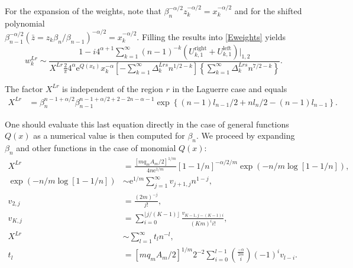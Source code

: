 \documentclass[11pt]{article}
\newcommand{\R}{{\operatorname{right}}}
\renewcommand{\L}{{\operatorname{left}}}
\newcommand{\ql}{L}
\newcommand{\rg}{r}
\newcommand{\pg}{p}
\newcommand{\pd}{d}
\newcommand{\ps}{s}
\numberwithin{equation}{section}
\newcommand{\ee}{\mathrm{e}}
\begin{document}
For the expansion of the weights, note that $\beta_n^{-\alpha/2} z_k^{-\alpha/2} = x_k^{-\alpha/2}$ and for the shifted polynomial \\$\beta_{n-1}^{-\alpha/2} \left(\bar{z} = z_k \beta_{n}/\beta_{n-1}\right)^{-\alpha/2} = x_k^{-\alpha/2}$. %
Filling the results into \cref{Eweights} yields%
\begin{equation}
	w_k^{\ql\rg} \sim \frac{ 1-i4^{\alpha+1}\sum_{k=1}^\infty (n-1)^{-k}(U_{k,1}^{\R} + U_{k,1}^{\L})|_{1,2} }{X^{\ql\rg} \frac{2}{\pi} 4^{\alpha} \ee^{Q(x_k)} x_k^{-\alpha} \left[ - \sum_{k=1}^\infty \Delta_k^{\ql\rg\ps} n^{1/2-k} \right] \left\{ \sum_{k=1}^\infty \Delta_k^{\ql\rg\ps} n^{7/2 -k} \right\} }. \label{EwkDelta}%
\end{equation}

The factor $X^{\ql\rg}$ is %
independent of the region $\rg$ in the Laguerre case and equals %
\begin{align}%
	X^{\ql\rg} & = \beta_n^{n-1 + \alpha/2}\beta_{n-1}^{n-1+\alpha/2 +2-2n-\alpha-1 }\exp\left\{ (n-1) l_{n-1}/2+ n l_n/2 -(n-1) l_{n-1} \right\}.
\end{align}

One should evaluate this last equation directly in the case of general functions $Q(x)$ as a numerical value is then computed for $\beta_n$. We proceed by expanding $\beta_n$ and other functions in the case of monomial $Q(x)$:
\begin{align}
	X^{\ql\rg} & = \frac{\left[mq_mA_m/2\right]^{1/m} }{ 4n \ee^{1/m} } [1-1/n]^{-\alpha/2/m} \exp\left(-n/m\log[1-1/n]\right), \\ %
	\exp\left(-n/m\log[1-1/n]\right) & \sim \ee^{1/m} \sum_{j=1}^\infty v_{j+1,j} n^{1-j}, \\ %
	v_{2,j} & = \frac{(2m)^{-j}}{j!}, \label{Eu2lag} \\
	v_{K,j} & = \sum_{i=0}^{\lfloor j/(K-1) \rfloor} \frac{v_{K-1,j-(K-1)i} }{ (Km)^{i} i!} \label{EuKlag}, \\
	X^{\ql\rg} & \sim \sum_{l=1}^\infty t_l n^{-l},  \\ 
	t_l & = [mq_mA_m/2]^{1/m} 2^{-2} \sum_{i=0}^{l-1} {\tfrac{-\alpha}{2m} \choose i} (-1)^i v_{l-i}.
\end{align}
\end{document}
